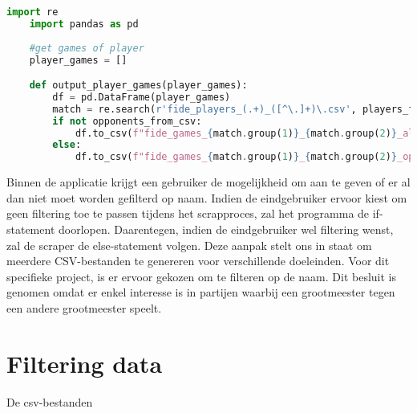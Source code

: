 \begin{lstlisting}[language=Python]
    import re
    import pandas as pd
    
    #get games of player
    player_games = []

    def output_player_games(player_games):
        df = pd.DataFrame(player_games)
        match = re.search(r'fide_players_(.+)_([^\.]+)\.csv', players_file_name)
        if not opponents_from_csv:
            df.to_csv(f"fide_games_{match.group(1)}_{match.group(2)}_all.csv", index=False)
        else:
            df.to_csv(f"fide_games_{match.group(1)}_{match.group(2)}_oppfromcsv.csv", index=False)
\end{lstlisting}

Binnen de applicatie krijgt een gebruiker de mogelijkheid om aan te geven of er al dan niet moet worden gefilterd op naam. Indien de eindgebruiker ervoor kiest om geen filtering toe te passen tijdens het scrapproces, zal het programma de if-statement doorlopen. Daarentegen, indien de eindgebruiker wel filtering wenst, zal de scraper de else-statement volgen. Deze aanpak stelt ons in staat om meerdere CSV-bestanden te genereren voor verschillende doeleinden. Voor dit specifieke project, is er ervoor gekozen om te filteren op de naam. Dit besluit is genomen omdat er enkel interesse is in partijen waarbij een grootmeester tegen een andere grootmeester speelt.

\section{Filtering data}

De csv-bestanden
